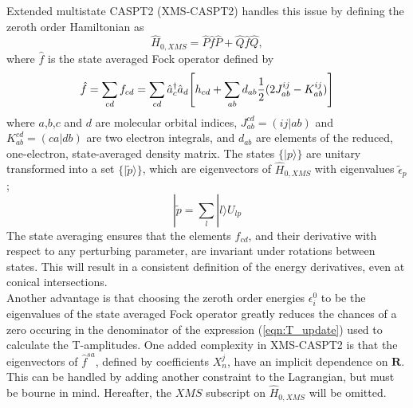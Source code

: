 \documentclass[12pt]{article}
\begin{document}
\noindent Extended multistate CASPT2 (XMS-CASPT2) handles this issue by defining the zeroth order Hamiltonian as
\begin{equation}
\hat{H}_{0,XMS} = \hat{P}\hat{f}\hat{P} +  \hat{Q}\hat{f}\hat{Q},
\end{equation}
where $\hat{f}$ is the state averaged Fock operator defined by
\begin{equation}
\hat{f} = \sum_{cd}f_{cd} = \sum_{cd}
\hat{a}^{\dagger}_{c}\hat{a}_{d}
\Bigg{[} h_{cd} 
+ \sum_{ab}d_{ab}
\frac{1}{2}( 2J^{ij}_{ab}-K^{ij}_{ab})  \Bigg{]}
\end{equation}
where $a$,$b$,$c$ and $d$ are molecular orbital indices,
$J^{cd}_{ab} = (ij|ab)$ and $K^{cd}_{ab} = (ca|db)$ are two electron integrals, and $d_{ab}$ are elements of the reduced, one-electron,
state-averaged density matrix. The states $\{|p\rangle\}$ are unitary transformed into a set $\{|\tilde{p}\rangle\}$, 
which are eigenvectors of $\hat{H}_{0,XMS}$ with eigenvalues $\tilde{\epsilon}_{p}$;
\begin{equation}
|\tilde{p} = \sum_{l}|l\rangle U_{lp}
\end{equation}
The state averaging ensures that the elements $f_{cd}$, and their derivative with respect to any perturbing 
parameter, are invariant under rotations between states. This will result in a consistent definition of 
the energy derivatives, even at conical intersections.\\

\noindent Another advantage is that choosing the zeroth order energies $\epsilon^{0}_{i}$ 
to be the eigenvalues of the state averaged Fock operator greatly reduces the chances 
of a zero occuring in the denominator of the expression (\ref{eqn:T_update}) used to calculate 
the T-amplitudes. One added complexity in XMS-CASPT2 is that the eigenvectors of $\hat{f}^{sa}$, defined by coefficients $X_{n}^{j}$, 
have an implicit dependence on $\mathbf{R}$. This can be handled by adding another constraint to the Lagrangian,
but must be bourne in mind. Hereafter, the $XMS$ subscript on $\hat{H}_{0,XMS}$ will be omitted.


\end{document}
